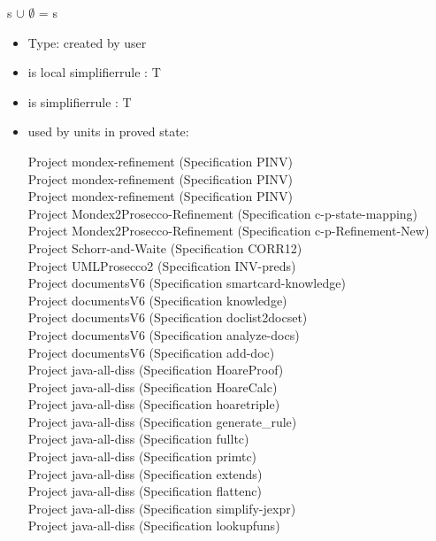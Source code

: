 \documentclass[a4paper]{article}
\begin{document}
\medskip

 \Fol s $\cup$ $\emptyset$ = s

\begin{itemize}

\item Type: created by user

\item is local simplifierrule : T
\item is simplifierrule : T
\item used by units in proved state:

Project mondex-refinement (Specification PINV) \\
Project mondex-refinement (Specification PINV) \\
Project mondex-refinement (Specification PINV) \\
Project Mondex2Prosecco-Refinement (Specification c-p-state-mapping) \\
Project Mondex2Prosecco-Refinement (Specification c-p-Refinement-New) \\
Project Schorr-and-Waite (Specification CORR12) \\
Project UMLProsecco2 (Specification INV-preds) \\
Project documentsV6 (Specification smartcard-knowledge) \\
Project documentsV6 (Specification knowledge) \\
Project documentsV6 (Specification doclist2docset) \\
Project documentsV6 (Specification analyze-docs) \\
Project documentsV6 (Specification add-doc) \\
Project java-all-diss (Specification HoareProof) \\
Project java-all-diss (Specification HoareCalc) \\
Project java-all-diss (Specification hoaretriple) \\
Project java-all-diss (Specification generate\_rule) \\
Project java-all-diss (Specification fulltc) \\
Project java-all-diss (Specification primtc) \\
Project java-all-diss (Specification extends) \\
Project java-all-diss (Specification flattenc) \\
Project java-all-diss (Specification simplify-jexpr) \\
Project java-all-diss (Specification lookupfuns) \\

\end{itemize}
\end{document}
